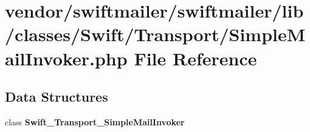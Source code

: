 \section{vendor/swiftmailer/swiftmailer/lib/classes/\+Swift/\+Transport/\+Simple\+Mail\+Invoker.php File Reference}
\label{_simple_mail_invoker_8php}
\subsection*{Data Structures}
\begin{DoxyCompactItemize}
\item 
class {\bf Swift\+\_\+\+Transport\+\_\+\+Simple\+Mail\+Invoker}
\end{DoxyCompactItemize}

